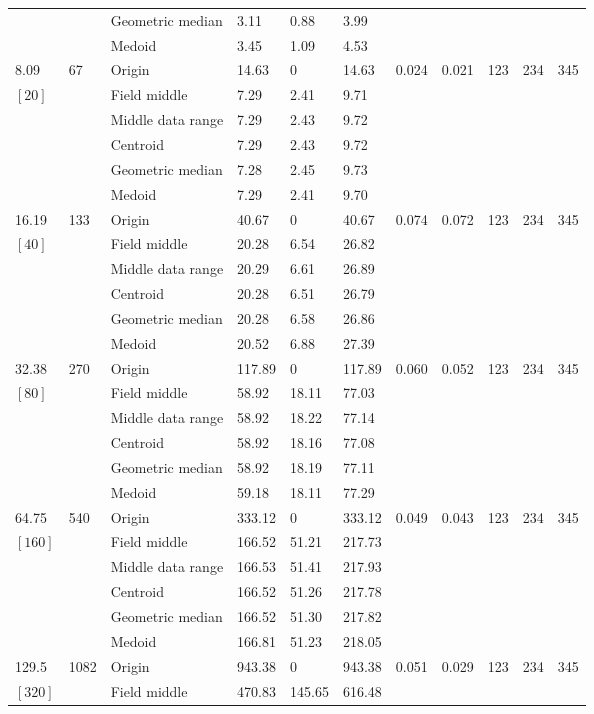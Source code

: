 \documentclass[phd,showframe]{ndsu-thesis-2022}
\begin{document}
\begin{landscape}
{{\begin{ThreePartTable}
\begin{longtable}{lll lll ll rrr}
 &  & Geometric median & 3.11 & 0.88 & 3.99 \\
 &  & Medoid  & 3.45 & 1.09 & 4.53 \\
\midrule
8.09 & 67 & Origin  & 14.63 & 0 & 14.63 & 0.024 & 0.021 & 123 & 234 & 345 \\
$[20]$ &  & Field middle  & 7.29 & 2.41 & 9.71 \\
 &  & Middle data range  & 7.29 & 2.43 & 9.72 \\
 &  & Centroid & 7.29 & 2.43 & 9.72 \\
 &  & Geometric median & 7.28 & 2.45 & 9.73 \\
 &  & Medoid  & 7.29 & 2.41 & 9.70 \\ 
\midrule
16.19 & 133 & Origin  & 40.67 & 0 & 40.67 & 0.074 & 0.072 & 123 & 234 & 345 \\
$[40]$ &  & Field middle  & 20.28 & 6.54 & 26.82 \\
 &  & Middle data range  & 20.29 & 6.61 & 26.89 \\
 &  & Centroid & 20.28 & 6.51 & 26.79 \\
 &  & Geometric median & 20.28 & 6.58 & 26.86 \\
 &  & Medoid  & 20.52 & 6.88 & 27.39 \\
\midrule
32.38 & 270 & Origin  & 117.89 & 0 & 117.89 & 0.060 & 0.052 & 123 & 234 & 345 \\
$[80]$ &  & Field middle  & 58.92 & 18.11 & 77.03 \\
 &  & Middle data range  & 58.92 & 18.22 & 77.14 \\
 &  & Centroid & 58.92 & 18.16 & 77.08 \\
 &  & Geometric median & 58.92 & 18.19 & 77.11 \\
 &  & Medoid  & 59.18 & 18.11 & 77.29 \\
\midrule
64.75 & 540 & Origin  & 333.12 & 0 & 333.12 & 0.049 & 0.043 & 123 & 234 & 345 \\
$[160]$ &  & Field middle  & 166.52 & 51.21 & 217.73 \\
 &  & Middle data range  & 166.53 & 51.41 & 217.93 \\
 &  & Centroid & 166.52 & 51.26 & 217.78 \\
 &  & Geometric median & 166.52 & 51.30 & 217.82 \\
 &  & Medoid  & 166.81 & 51.23 & 218.05 \\
\midrule
129.5 & 1082 & Origin  & 943.38 & 0 & 943.38 & 0.051 & 0.029 & 123 & 234 & 345 \\
$[320]$ &  & Field middle  & 470.83 & 145.65 & 616.48 \\

\end{longtable}
\end{ThreePartTable}}}
\end{landscape}
\end{document}

